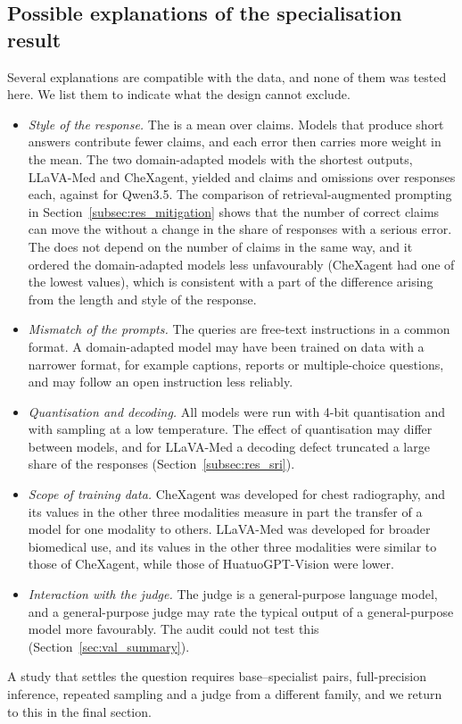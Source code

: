 \subsection{Possible explanations of the specialisation result}\label{sec:disc_explain}
Several explanations are compatible with the data, and none of them was tested here. We list them to indicate what the design cannot exclude.
\begin{itemize}
  \item \emph{Style of the response.} The \SMHR{} is a mean over claims. Models that produce short answers contribute fewer claims, and each error then carries more weight in the mean. The two domain-adapted models with the shortest outputs, LLaVA-Med and CheXagent, yielded  and  claims and omissions over \Ncalls{} responses each, against  for Qwen3.5. The comparison of retrieval-augmented prompting in Section~\ref{subsec:res_mitigation} shows that the number of correct claims can move the \SMHR{} without a change in the share of responses with a serious error. The \CHR{} does not depend on the number of claims in the same way, and it ordered the domain-adapted models less unfavourably (CheXagent had one of the lowest values), which is consistent with a part of the difference arising from the length and style of the response.
  \item \emph{Mismatch of the prompts.} The queries are free-text instructions in a common format. A domain-adapted model may have been trained on data with a narrower format, for example captions, reports or multiple-choice questions, and may follow an open instruction less reliably.
  \item \emph{Quantisation and decoding.} All models were run with 4-bit quantisation and with sampling at a low temperature. The effect of quantisation may differ between models, and for LLaVA-Med a decoding defect truncated a large share of the responses (Section~\ref{subsec:res_sri}).
  \item \emph{Scope of training data.} CheXagent was developed for chest radiography, and its values in the other three modalities measure in part the transfer of a model for one modality to others. LLaVA-Med was developed for broader biomedical use, and its \SRI{} values in the other three modalities were similar to those of CheXagent, while those of HuatuoGPT-Vision were lower.
  \item \emph{Interaction with the judge.} The judge is a general-purpose language model, and a general-purpose judge may rate the typical output of a general-purpose model more favourably. The audit could not test this (Section~\ref{sec:val_summary}).
\end{itemize}
A study that settles the question requires base--specialist pairs, full-precision inference, repeated sampling and a judge from a different family, and we return to this in the final section.

